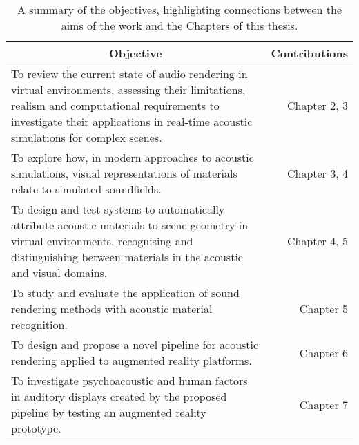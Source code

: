 \begin{table}[tbp]
  \centering
  \caption{A summary of the objectives, highlighting connections between the aims of the work and the Chapters of this thesis.}\label{tab:objectives-contributions}
    \begin{tabularx}{\linewidth}{Xr}
    \toprule
    \multicolumn{1}{c}{Objective} & \multicolumn{1}{c}{Contributions} \\ \midrule
    To review the current state of audio rendering in virtual environments, assessing their limitations, realism and computational requirements to  investigate their applications in real-time acoustic simulations for complex scenes.\newline &  Chapter 2, 3 \\
    To explore how, in modern approaches to acoustic simulations, visual representations of materials relate to simulated soundfields.\newline & Chapter 3, 4 \\
    To design and test systems to automatically attribute acoustic materials to scene geometry in virtual environments, recognising and distinguishing between materials in the acoustic and visual domains.\newline & Chapter 4, 5 \\
    To study and evaluate the application of sound rendering methods with acoustic material recognition.\newline & Chapter 5 \\
    To design and propose a novel pipeline for acoustic rendering applied to augmented reality platforms.\newline & Chapter 6 \\
    To investigate psychoacoustic and human factors in auditory displays created by the proposed pipeline by testing an augmented reality prototype.\newline & Chapter 7 \\ \bottomrule
    \end{tabularx}
\end{table}